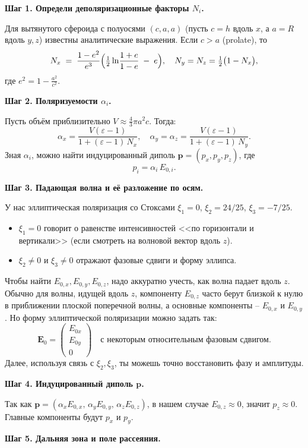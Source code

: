 \documentclass{article}
\begin{document}
\textbf{Шаг 1. Определи деполяризационные факторы $N_i$.}

Для вытянутого сфероида с полуосями $(c,a,a)$ (пусть $c = h$ вдоль $x$, а $a = R$ вдоль $y,z$) известны аналитические выражения. Если $c > a$ (prolate), то
\[
  N_x \;=\; \frac{1-e^2}{e^3}\Bigl(\tfrac12 \ln\!\frac{1+e}{1-e} \;-\; e\Bigr),
  \quad
  N_y = N_z = \tfrac{1}{2}\bigl(1 - N_x\bigr),
\]
где $e^2 = 1 - \tfrac{a^2}{c^2}$.

\textbf{Шаг 2. Поляризуемости $\alpha_i$.}

Пусть объём приблизительно $V \approx \tfrac43\pi a^2 c$. Тогда:
\[
  \alpha_x = \frac{V(\varepsilon - 1)}{1 + (\varepsilon - 1)\,N_x},\quad
  \alpha_y = \alpha_z = \frac{V(\varepsilon - 1)}{1 + (\varepsilon - 1)\,N_y}.
\]
Зная $\alpha_i$, можно найти индуцированный диполь $\mathbf{p} = (p_x, p_y, p_z)$, где
\[
  p_i = \alpha_i\,E_{0,i}.
\]

\textbf{Шаг 3. Падающая волна и её разложение по осям.}

У нас эллиптическая поляризация со Стоксами $\xi_1=0$, $\xi_2=24/25$, $\xi_3=-7/25$.
\begin{itemize}
  \item $\xi_1=0$ говорит о равенстве интенсивностей <<по горизонтали и вертикали>> (если смотреть на волновой вектор вдоль $z$).
  \item $\xi_2\neq0$ и $\xi_3\neq0$ отражают фазовые сдвиги и форму эллипса.
\end{itemize}
Чтобы найти $E_{0,x}, E_{0,y}, E_{0,z}$, надо аккуратно учесть, как волна падает вдоль $z$. Обычно для волны, идущей вдоль $z$, компоненту $E_{0,z}$ часто берут близкой к нулю в приближении плоской поперечной волны, а основные компоненты – $E_{0,x}$ и $E_{0,y}$. Но форму эллиптической поляризации можно задать так:
\[
  \mathbf{E}_0 =
  \begin{pmatrix}
  E_{0x}\\[6pt]
  E_{0y}\\[6pt]
  0
  \end{pmatrix}
  \quad \text{с некоторым относительным фазовым сдвигом.}
\]
Далее, используя связь с $\xi_2,\xi_3$, ты можешь точно восстановить фазу и амплитуды.

\textbf{Шаг 4. Индуцированный диполь $\mathbf{p}$.}

Так как $\mathbf{p} = (\alpha_x E_{0,x}, \,\alpha_y E_{0,y},\, \alpha_z E_{0,z})$, в нашем случае $E_{0,z}\approx 0$, значит $p_z \approx 0$. Главные компоненты будут $p_x$ и $p_y$.

\textbf{Шаг 5. Дальняя зона и поле рассеяния.}
\end{document}

